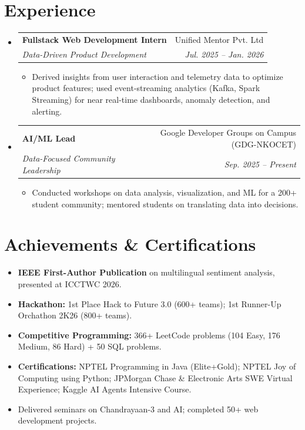 \documentclass[letterpaper,11pt]{article}
\makeatletter
\newcommand{\resumeItem}[1]{
  \item\small{
    {#1 \vspace{-2pt}}
  }
}
\newcommand{\resumeSubheading}[4]{
  \vspace{-2pt}\item
    \begin{tabular*}{0.97\textwidth}[t]{l@{\extracolsep{\fill}}r}
      \textbf{#1} & #2 \\
      \textit{\small#3} & \textit{\small #4} \\
    \end{tabular*}\vspace{-7pt}
}
\newcommand{\resumeSubHeadingListStart}{\begin{itemize}[leftmargin=0.15in, label={}]}
\newcommand{\resumeSubHeadingListEnd}{\end{itemize}}
\newcommand{\resumeItemListStart}{\begin{itemize}}
\newcommand{\resumeItemListEnd}{\end{itemize}\vspace{-5pt}}
\makeatother
\begin{document}
\section{Experience}
  \resumeSubHeadingListStart
    \resumeSubheading
      {Fullstack Web Development Intern}{Unified Mentor Pvt. Ltd}
      {Data-Driven Product Development}{Jul. 2025 -- Jan. 2026}
      \resumeItemListStart
        \resumeItem{Derived insights from user interaction and telemetry data to optimize product features; used event-streaming analytics (Kafka, Spark Streaming) for near real-time dashboards, anomaly detection, and alerting.}
      \resumeItemListEnd
    \resumeSubheading
      {AI/ML Lead}{Google Developer Groups on Campus (GDG-NKOCET)}
      {Data-Focused Community Leadership}{Sep. 2025 -- Present}
      \resumeItemListStart
        \resumeItem{Conducted workshops on data analysis, visualization, and ML for a 200+ student community; mentored students on translating data into decisions.}
      \resumeItemListEnd
  \resumeSubHeadingListEnd

\section{Achievements \& Certifications}
 \begin{itemize}[leftmargin=0.15in, label={}]
    \resumeItem{\textbf{IEEE First-Author Publication} on multilingual sentiment analysis, presented at ICCTWC 2026.}
    \resumeItem{\textbf{Hackathon:} 1st Place Hack to Future 3.0 (600+ teams); 1st Runner-Up Orchathon 2K26 (800+ teams).}
    \resumeItem{\textbf{Competitive Programming:} 366+ LeetCode problems (104 Easy, 176 Medium, 86 Hard) + 50 SQL problems.}
    \resumeItem{\textbf{Certifications:} NPTEL Programming in Java (Elite+Gold); NPTEL Joy of Computing using Python; JPMorgan Chase \& Electronic Arts SWE Virtual Experience; Kaggle AI Agents Intensive Course.}
    \resumeItem{Delivered seminars on Chandrayaan-3 and AI; completed 50+ web development projects.}
 \end{itemize}
\end{document}
